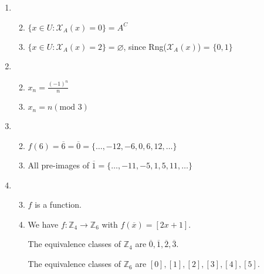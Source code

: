\documentclass[12pt,letterpaper]{article}
\begin{document}
\begin{enumerate}
\begin{enumerate}
\begin{enumerate}
\begin{proof}
                Now, choose $(x, y), (x, z) \in R$.

                We have $x^2 + y = 2 \implies y = 2 - x^2 = z$,
                so $y = z$.

                Thus we have shown that $R$ is a function on $\mathbb{Z}$.
              \end{proof}
          \end{enumerate}
        \setcounter{enumii}{7}
        \item
          \begin{enumerate}
            \setcounter{enumiii}{1}
            \item $\{x \in U : \mathcal{X}_A(x) = 0\} = A^C$
            \item $\{x \in U : \mathcal{X}_A(x) = 2\} = \varnothing$,
              since Rng($\mathcal{X}_A(x)$) = $\{0, 1\}$
          \end{enumerate}
        \item
          \begin{enumerate}
            \setcounter{enumiii}{1}
            \item $x_n = \frac{(-1)^n}{n}$
            \setcounter{enumiii}{3}
            \item $x_n = n (\text{mod } 3)$
          \end{enumerate}
        \item
          \begin{enumerate}
            \setcounter{enumiii}{1}
            \item
              $f(6) = \overline{6} = \overline{0} = \{\dots, -12, -6, 0, 6, 12, \dots\}$
            \setcounter{enumiii}{3}
            \item
              All pre-images of $\overline{1} = \{\dots, -11, -5, 1, 5, 11, \dots\}$
          \end{enumerate}
        \item
          \begin{enumerate}
            \setcounter{enumiii}{2}
            \item $f$ is a function.
            \item
              We have $f : \mathbb{Z}_4 \to \mathbb{Z}_6$ with $f\left(\overline{x}\right) = [2x + 1]$.

              The equivalence classes of $\mathbb{Z}_4$ are $\overline{0}, \overline{1}, \overline{2}, \overline{3}$.

              The equivalence classes of $\mathbb{Z}_6$ are $[0], [1], [2], [3], [4], [5]$.


\end{enumerate}
\end{enumerate}
\end{enumerate}
\end{document}

